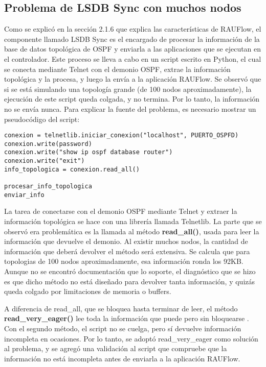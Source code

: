 \subsection{Problema de LSDB Sync con muchos nodos}
Como se explicó en la sección 2.1.6 que explica las características de RAUFlow, el componente llamado LSDB Sync es el encargado de procesar la información de la base de datos topológica de OSPF y enviarla a las aplicaciones que se ejecutan en el controlador. Este proceso se lleva a cabo en un script escrito en Python, el cual se conecta mediante Telnet con el demonio OSPF, extrae la información topológica y la procesa, y luego la envía a la aplicación RAUFlow. Se observó que si se está simulando una topología grande (de 100 nodos aproximadamente), la ejecución de este script queda colgada, y no termina. Por lo tanto, la información no se envía nunca. Para explicar la fuente del problema, es necesario mostrar un pseudocódigo del script:
\begin{lstlisting}
conexion = telnetlib.iniciar_conexion("localhost", PUERTO_OSPFD)
conexion.write(password)
conexion.write("show ip ospf database router")
conexion.write("exit")
info_topologica = conexion.read_all()

procesar_info_topologica
enviar_info
\end{lstlisting}

La tarea de conectarse con el demonio OSPF mediante Telnet y extraer la información topológica se hace con una librería llamada Telnetlib. La parte que se observó era problemática es la llamada al método \textbf{read\_all()}, usada para leer la información que devuelve el demonio. Al existir muchos nodos, la cantidad de información que deberá devolver el método será extensiva. Se calcula que para topologias de 100 nodos aproximadamente, esa información ronda los 92KB. Aunque no se encontró documentación que lo soporte, el diagnóstico que se hizo es que dicho método no está diseñado para devolver tanta información, y quizás queda colgado por limitaciones de memoria o buffers.

A diferencia de read\_all, que se bloquea hasta terminar de leer, el método \textbf{read\_very\_eager()} lee toda la información que puede pero sin bloquearse \cite{doc-telnetlib}. Con el segundo método, el script no se cuelga, pero sí devuelve información incompleta en ocasiones. Por lo tanto, se adoptó read\_very\_eager como solución al problema, y se agregó una validación al script que compruebe que la información no está incompleta antes de enviarla a la aplicación RAUFlow.

